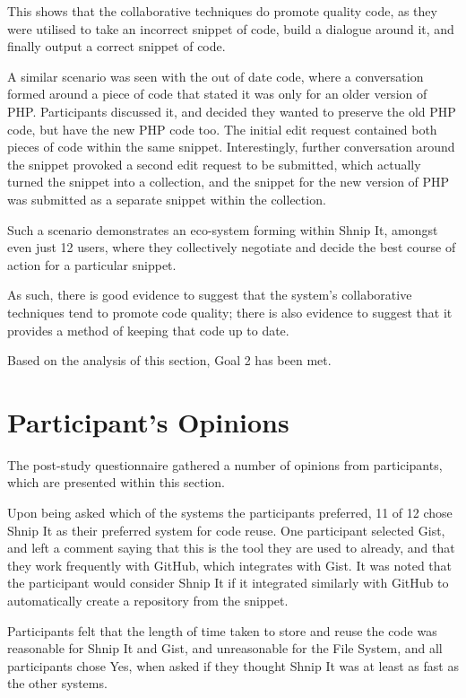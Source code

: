 This shows that the collaborative techniques do promote quality code, as they were utilised to take an incorrect snippet of code, build a dialogue around it, and finally output a correct snippet of code.

A similar scenario was seen with the out of date code, where a conversation formed around a piece of code that stated it was only for an older version of PHP.
Participants discussed it, and decided they wanted to preserve the old PHP code, but have the new PHP code too.
The initial edit request contained both pieces of code within the same snippet.
Interestingly, further conversation around the snippet provoked a second edit request to be submitted, which actually turned the snippet into a collection, and the snippet for the new version of PHP was submitted as a separate snippet within the collection.

Such a scenario demonstrates an eco-system forming within Shnip It, amongst even just 12 users, where they collectively negotiate and decide the best course of action for a particular snippet. 

As such, there is good evidence to suggest that the system's collaborative techniques tend to promote code quality; there is also evidence to suggest that it provides a method of keeping that code up to date.

Based on the analysis of this section, Goal 2 has been met.

\section{Participant's Opinions}
The post-study questionnaire gathered a number of opinions from participants, which are presented within this section.

Upon being asked which of the systems the participants preferred, 11 of 12 chose Shnip It as their preferred system for code reuse.
One participant selected Gist, and left a comment saying that this is the tool they are used to already, and that they work frequently with GitHub, which integrates with Gist.
It was noted that the participant would consider Shnip It if it integrated similarly with GitHub to automatically create a repository from the snippet.

Participants felt that the length of time taken to store and reuse the code was reasonable for Shnip It and Gist, and unreasonable for the File System, and all participants chose Yes, when asked if they thought Shnip It was at least as fast as the other systems.

